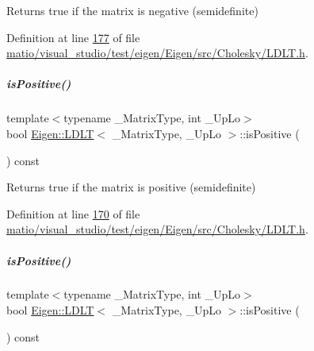 \begin{DoxyReturn}{Returns}
true if the matrix is negative (semidefinite) 
\end{DoxyReturn}


Definition at line \hyperlink{matio_2visual__studio_2test_2eigen_2_eigen_2src_2_cholesky_2_l_d_l_t_8h_source_l00177}{177} of file \hyperlink{matio_2visual__studio_2test_2eigen_2_eigen_2src_2_cholesky_2_l_d_l_t_8h_source}{matio/visual\+\_\+studio/test/eigen/\+Eigen/src/\+Cholesky/\+L\+D\+L\+T.\+h}.

\mbox{\label{group___cholesky___module_a5e1c6b7ba8d7b82575d6ffdc3bf35bcb}} 
\subparagraph{\texorpdfstring{is\+Positive()}{isPositive()}\hspace{0.1cm}{\footnotesize\ttfamily [1/2]}}
{\footnotesize\ttfamily template$<$typename \+\_\+\+Matrix\+Type, int \+\_\+\+Up\+Lo$>$ \\
bool \hyperlink{group___cholesky___module_class_eigen_1_1_l_d_l_t}{Eigen\+::\+L\+D\+LT}$<$ \+\_\+\+Matrix\+Type, \+\_\+\+Up\+Lo $>$\+::is\+Positive (\begin{DoxyParamCaption}{ }\end{DoxyParamCaption}) const\hspace{0.3cm}{\ttfamily [inline]}}

\begin{DoxyReturn}{Returns}
true if the matrix is positive (semidefinite) 
\end{DoxyReturn}


Definition at line \hyperlink{matio_2visual__studio_2test_2eigen_2_eigen_2src_2_cholesky_2_l_d_l_t_8h_source_l00170}{170} of file \hyperlink{matio_2visual__studio_2test_2eigen_2_eigen_2src_2_cholesky_2_l_d_l_t_8h_source}{matio/visual\+\_\+studio/test/eigen/\+Eigen/src/\+Cholesky/\+L\+D\+L\+T.\+h}.

\mbox{\label{group___cholesky___module_a5e1c6b7ba8d7b82575d6ffdc3bf35bcb}} 
\subparagraph{\texorpdfstring{is\+Positive()}{isPositive()}\hspace{0.1cm}{\footnotesize\ttfamily [2/2]}}
{\footnotesize\ttfamily template$<$typename \+\_\+\+Matrix\+Type, int \+\_\+\+Up\+Lo$>$ \\
bool \hyperlink{group___cholesky___module_class_eigen_1_1_l_d_l_t}{Eigen\+::\+L\+D\+LT}$<$ \+\_\+\+Matrix\+Type, \+\_\+\+Up\+Lo $>$\+::is\+Positive (\begin{DoxyParamCaption}{ }\end{DoxyParamCaption}) const\hspace{0.3cm}{\ttfamily [inline]}}

